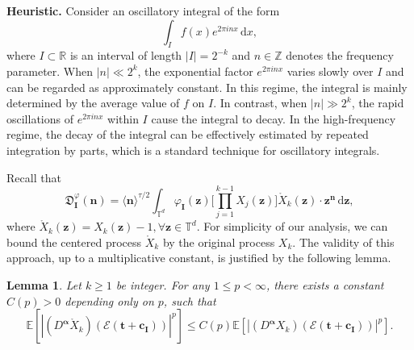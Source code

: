 \documentclass[12pt]{amsart}
\newtheorem{lemma}[theorem]{Lemma}
\theoremstyle{definition}
\theoremstyle{remark}
\newcommand{\bt}{\boldsymbol{t}}
\newcommand{\bz}{\boldsymbol{z}}
\newcommand{\R}{\mathbb{R}}
\newcommand{\Z}{\mathbb{Z}}
\newcommand{\E}{\mathbb{E}}
\newcommand{\T}{\mathbb{T}}
\numberwithin{equation}{section}
\begin{document}
{\flushleft \bf Heuristic.} Consider an oscillatory integral of the form
\[
\int_I f(x) e^{2\pi i n x} \, \mathrm{d}x,
\]
where $I \subset \R$ is an interval of length $|I| = 2^{-k}$ and $n \in \Z$ denotes the frequency parameter. When $|n| \ll 2^k$, the exponential factor $e^{2\pi i n x}$ varies slowly over $I$ and can be regarded as approximately constant. In this regime, the integral is mainly determined by the average value of $f$ on $I$. In contrast, when $|n| \gg 2^k$, the rapid oscillations of $e^{2\pi i n x}$ within $I$ cause the integral to decay. In the high-frequency regime, the decay of the integral can be effectively estimated by repeated integration by parts, which is a standard technique for oscillatory integrals. 

Recall that
\[
\mathfrak{D}_{\boldsymbol{I}}^\varphi(\boldsymbol{n})=\langle \boldsymbol{n}\rangle^{\tau/2}\int_{\T^d}\varphi_{\boldsymbol{I}}(\bz)\bigg[\prod_{j=1}^{k-1}X_j(\bz)\bigg]\mathring{X}_k(\bz)\cdot \bz^{\boldsymbol{n}}\,\mathrm{d}\bz,
\]
where $\mathring{X}_k(\bz)=X_k(\bz)-1,\forall \bz\in \T^d$. For simplicity of our analysis, we can bound the centered process $\mathring{X}_k$ by the original process $X_k$. The validity of this approach, up to a multiplicative constant, is justified by the following lemma.
\begin{lemma}\label{lemma:substitue-Xk-ring}
	Let $k\ge 1$ be integer. For any $1\le p<\infty$, there exists a constant $C(p)>0$ depending only on $p$, such that 
	\[
	\E[|(D^{\boldsymbol{\alpha}}\mathring{X}_k)(\mathcal{E}(\bt+\boldsymbol{c_I}))|^p]\le C(p)\E[|(D^{\boldsymbol{\alpha}}X_k)(\mathcal{E}(\bt+\boldsymbol{c_I}))|^p].
	\]
\end{lemma}
\end{document}
